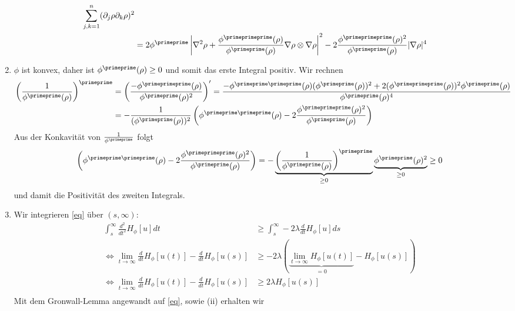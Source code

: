 \begin{solution}
\begin{enumerate}[label = (\roman*)]
\begin{align*}
  \sum_{j,k=1}^n(\partial_j\rho\partial_k\rho)^2\\
  &= 2\phi^{\primeprime}\left|\nabla^2\rho +
  \frac{\phi^{\primeprimeprime}(\rho)}{\phi^{\primeprime}(\rho)} \nabla\rho \otimes
  \nabla \rho \right|^2 -
   2\frac{\phi^{\primeprimeprime}(\rho)^2}{\phi^{\primeprime}(\rho)}
  |\nabla\rho|^4\\
  \end{align*}
  \item $\phi$ ist konvex, daher ist $\phi^{\primeprime}(\rho) \geq 0$ und
  somit das erste Integral positiv. Wir rechnen
  \begin{align*}
  \left(\frac{1}{\phi^{\primeprime}(\rho)}\right)^{\primeprime} &=
  \left(\frac{-\phi^{\primeprimeprime}(\rho)}{\phi^{\primeprime}(\rho)^2}\right)^{\prime} =
  \frac{-\phi^{\primeprime\primeprime}(\rho)(\phi^{\primeprime}(\rho))^2 +
  2(\phi^{\primeprimeprime}(\rho))^2\phi^{\primeprime}(\rho)}{\phi^{\primeprime}(\rho)^4} \\
  &= -\frac{1}{(\phi^{\primeprime}(\rho))^2}
  \left(\phi^{\primeprime\primeprime}(\rho) -
  2\frac{\phi^{\primeprimeprime}(\rho)^2}{\phi^{\primeprime}(\rho)}\right)
  \end{align*}
  Aus der Konkavität von $\frac{1}{\phi^{\primeprime}}$ folgt
  \begin{align*}
  \left(\phi^{\primeprime\primeprime}(\rho) -
  2\frac{\phi^{\primeprimeprime}(\rho)^2}{\phi^{\primeprime}(\rho)}\right) =
  -\underbrace{\left(\frac{1}{\phi^{\primeprime}(\rho)}\right)^{\primeprime}}
  _{\geq 0}\underbrace{\phi^{\primeprime}(\rho)^2}_{\geq 0} \geq 0
  \end{align*}
  und damit die Positivität des zweiten Integrals.
  \item Wir integrieren \eqref{eq} über $(s,\infty)$:
  \begin{align*}
    \int_s^{\infty}  \frac{d^{2}}{d t^{2}} H_{\phi}[u] dt &\geq
    \int_s^{\infty} -2 \lambda \frac{d}{d t} H_{\phi}[u] ds \\
    \iff \lim_{t \to \infty} \frac{d}{d t} H_{\phi}[u(t)] -\frac{d}{d t} H_{\phi}[u(s)]
    &\geq -2\lambda(\underbrace{\lim_{t \to \infty} H_{\phi}[u(t)]}_{=0} - H_{\phi}[u(s)]) \\
    \iff \lim_{t \to \infty} \frac{d}{d t} H_{\phi}[u(t)] -\frac{d}{d t} H_{\phi}[u(s)]
    &\geq 2\lambda H_{\phi}[u(s)] \\
  \end{align*}
  Mit dem Gronwall-Lemma angewandt auf \eqref{eq}, sowie (ii) erhalten wir
  \begin{align*}

\end{align*}
\end{enumerate}
\end{solution}
